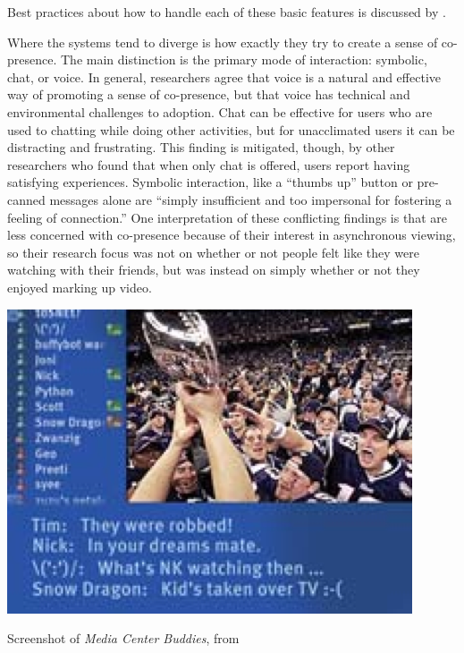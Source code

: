 Best practices about how to handle each of these basic features is discussed by \citep{sociability.heuristics}.
	
Where the systems tend to diverge is how exactly they try to create a sense of co-presence. The main distinction is the primary mode of interaction: symbolic, chat, or voice. In general, researchers agree that voice is a natural and effective way of promoting a sense of co-presence, but that voice has technical and environmental challenges to adoption. Chat can be effective for users who are used to chatting while doing other activities, but for unacclimated users it can be distracting and frustrating. \citep{compare.voice.tex} This finding is mitigated, though, by other researchers who found that when only chat is offered, users report having satisfying experiences. \citep{regan2004media} Symbolic interaction, like a ``thumbs up'' button or pre-canned messages alone are ``simply insufficient and too impersonal for fostering a feeling of connection.'' \citep{examiningpresence} One interpretation of these conflicting findings is that \citet{compare.voice.tex} are less concerned with co-presence because of their interest in asynchronous viewing, so their research focus was not on whether or not people felt like they were watching with their friends, but was instead on simply whether or not they enjoyed marking up video.


\begin{marginfigure}
	\includegraphics{figures/roar/media_center.png}
	\caption{Screenshot of \emph{Media Center Buddies}, from \citep{regan2004media}}
	\label{fig:media_center}
\end{marginfigure}


